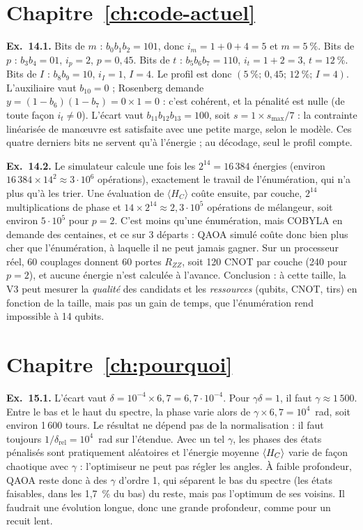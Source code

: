 \section*{Chapitre~\ref{ch:code-actuel} }
\textbf{Ex.~14.1.} Bits de $m$ : $b_0b_1b_2=101$, donc $i_m=1+0+4=5$ et $m=5~\%$. Bits de $p$ : $b_3b_4=01$, $i_p=2$, $p=0{,}45$. Bits de $t$ : $b_5b_6b_7=110$, $i_t=1+2=3$, $t=12~\%$. Bits de $I$ : $b_8b_9=10$, $i_I=1$, $I=4$. Le profil est donc $(5~\%;\,0{,}45;\,12~\%;\,I=4)$. L'auxiliaire vaut $b_{10}=0$ ; Rosenberg demande $y=(1-b_6)(1-b_7)=0\times1=0$ : c'est cohérent, et la pénalité est nulle (de toute façon $i_t\neq0$). L'écart vaut $b_{11}b_{12}b_{13}=100$, soit $s=1\times s_{\max}/7$ : la contrainte linéarisée de manœuvre est satisfaite avec une petite marge, selon le modèle. Ces quatre derniers bits ne servent qu'à l'énergie ; au décodage, seul le profil compte.

\textbf{Ex.~14.2.} Le simulateur calcule une fois les $2^{14}=16\,384$ énergies (environ $16\,384\times14^2\approx3\cdot10^6$ opérations), exactement le travail de l'énumération, qui n'a plus qu'à les trier. Une évaluation de $\langle H_C\rangle$ coûte ensuite, par couche, $2^{14}$ multiplications de phase et $14\times2^{14}\approx2{,}3\cdot10^5$ opérations de mélangeur, soit environ $5\cdot10^5$ pour $p=2$. C'est moins qu'une énumération, mais COBYLA en demande des centaines, et ce sur 3 départs : QAOA simulé coûte donc bien plus cher que l'énumération, à laquelle il ne peut jamais gagner. Sur un processeur réel, 60 couplages donnent 60 portes $R_{ZZ}$, soit 120 CNOT par couche (240 pour $p=2$), et aucune énergie n'est calculée à l'avance. Conclusion : à cette taille, la V3 peut mesurer la \emph{qualité} des candidats et les \emph{ressources} (qubits, CNOT, tirs) en fonction de la taille, mais pas un gain de temps, que l'énumération rend impossible à 14 qubits.

\section*{Chapitre~\ref{ch:pourquoi} }
\textbf{Ex.~15.1.} L'écart vaut $\delta=10^{-4}\times6{,}7=6{,}7\cdot10^{-4}$. Pour $\gamma\delta=1$, il faut $\gamma\approx1\,500$. Entre le bas et le haut du spectre, la phase varie alors de $\gamma\times6{,}7=10^4$~rad, soit environ 1\,600 tours. Le résultat ne dépend pas de la normalisation : il faut toujours $1/\delta_{\text{rel}}=10^4$~rad sur l'étendue. Avec un tel $\gamma$, les phases des états pénalisés sont pratiquement aléatoires et l'énergie moyenne $\langle H_C\rangle$ varie de façon chaotique avec $\gamma$ : l'optimiseur ne peut pas régler les angles. À faible profondeur, QAOA reste donc à des $\gamma$ d'ordre 1, qui séparent le bas du spectre (les états faisables, dans les 1,7~\% du bas) du reste, mais pas l'optimum de ses voisins. Il faudrait une évolution longue, donc une grande profondeur, comme pour un recuit lent.

